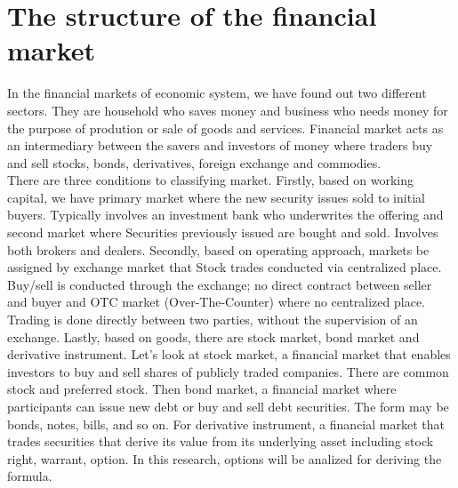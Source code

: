 \section{The structure of the financial market }
\fontsize{11pt}{20pt}\selectfont In the financial markets of economic system, we have found out two different sectors. They are household who saves money and business who needs money for the purpose of prodution or sale of goods and services. Financial market acts as an intermediary between the savers and investors of money where traders buy and sell stocks, bonds, derivatives, foreign exchange and commodies.\\[0.5cm]
There are three conditions to classifying market. Firstly, based on working capital, we have primary market where the new security issues sold to initial buyers. Typically involves an investment bank who underwrites the offering and second market where Securities previously issued are bought and sold. Involves both brokers and dealers. Secondly, based on operating approach, markets be assigned by exchange market that Stock trades conducted via centralized place. Buy/sell is conducted through the exchange; no direct contract between seller and buyer and OTC market (Over-The-Counter) where no centralized place. Trading is done directly between two parties, without the supervision of an exchange. Lastly, based on goods, there are stock market, bond market and derivative instrument. Let's look at stock market, a financial market that enables investors to buy and sell shares of publicly traded companies. There are common stock and preferred stock. Then bond market, a financial market where participants can issue new debt  or buy and sell debt securities. The form may be bonds, notes, bills, and so on. For derivative instrument, a financial market that trades securities that derive its value from its underlying asset including stock right, warrant, option. In this research, options will be analized for deriving the formula.  
